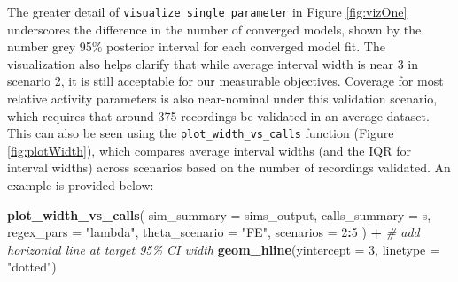 \documentclass[
]{article}
\newenvironment{Shaded}{\begin{snugshade}}{\end{snugshade}}
\newcommand{\AttributeTok}[1]{\textcolor[rgb]{0.13,0.29,0.53}{#1}}
\newcommand{\CommentTok}[1]{\textcolor[rgb]{0.56,0.35,0.01}{\textit{#1}}}
\newcommand{\DecValTok}[1]{\textcolor[rgb]{0.00,0.00,0.81}{#1}}
\newcommand{\FunctionTok}[1]{\textcolor[rgb]{0.13,0.29,0.53}{\textbf{#1}}}
\newcommand{\NormalTok}[1]{#1}
\newcommand{\OtherTok}[1]{\textcolor[rgb]{0.56,0.35,0.01}{#1}}
\newcommand{\SpecialCharTok}[1]{\textcolor[rgb]{0.81,0.36,0.00}{\textbf{#1}}}
\newcommand{\StringTok}[1]{\textcolor[rgb]{0.31,0.60,0.02}{#1}}
\begin{document}
The greater detail of \texttt{visualize\_single\_parameter} in Figure \ref{fig:vizOne} underscores the difference in the number of converged models, shown by the number grey 95\% posterior interval for each converged model fit. The visualization also helps clarify that while average interval width is near 3 in scenario 2, it is still acceptable for our measurable objectives. Coverage for most relative activity parameters is also near-nominal under this validation scenario, which requires that around 375 recordings be validated in an average dataset. This can also be seen using the \texttt{plot\_width\_vs\_calls} function (Figure \ref{fig:plotWidth}), which compares average interval widths (and the IQR for interval widths) across scenarios based on the number of recordings validated. An example is provided below:

\linespread{1}

\begin{Shaded}
\end{Shaded}

\linespread{1}

\linespread{1}

\begin{Shaded}
\begin{Highlighting}[]
\FunctionTok{plot\_width\_vs\_calls}\NormalTok{(}
  \AttributeTok{sim\_summary =}\NormalTok{ sims\_output, }
  \AttributeTok{calls\_summary =}\NormalTok{ s, }
  \AttributeTok{regex\_pars =} \StringTok{"lambda"}\NormalTok{, }
  \AttributeTok{theta\_scenario =} \StringTok{"FE"}\NormalTok{, }
  \AttributeTok{scenarios =} \DecValTok{2}\SpecialCharTok{:}\DecValTok{5}
\NormalTok{) }\SpecialCharTok{+} \CommentTok{\# add horizontal line at target 95\% CI width }
  \FunctionTok{geom\_hline}\NormalTok{(}\AttributeTok{yintercept =} \DecValTok{3}\NormalTok{, }\AttributeTok{linetype =} \StringTok{"dotted"}\NormalTok{) }
\end{Highlighting}
\end{Shaded}
\end{document}
